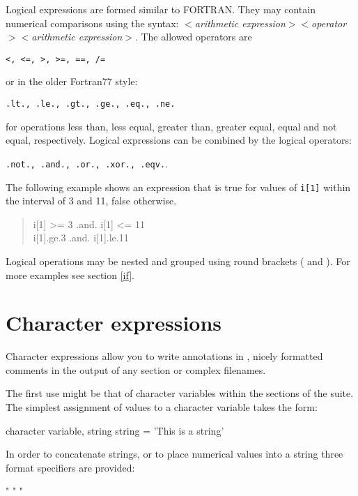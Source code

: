 Logical expressions are formed similar to FORTRAN. They may contain
numerical comparisons using the syntax: {\it $<$arithmetic
expression$><$operator$><$arithmetic expression$>$}. The allowed
operators are 

{\tt <, <=, >, >=, ==, /=}

or in the older Fortran77 style:

{\tt .lt., .le., .gt., .ge., .eq., .ne.} 

for operations less than, less equal, greater than,
greater equal, equal and not equal, respectively. Logical
expressions can be combined by the logical operators:

 {\tt .not., .and., .or., .xor., .eqv.}.

The following example shows an
expression that is true for values of {\tt i[1]} within the interval
of 3 and 11, false otherwise.

\begin{quote}
  i[1] >= 3 .and. i[1] <= 11 \\
  i[1].ge.3 .and. i[1].le.11
\end{quote}

Logical operations may be nested and grouped using round
brackets ( and ). For more examples see section \ref{if}.


\section{Character expressions\label{char-exp}}

Character expressions allow you to write annotations in \kuplot, nicely 
formatted comments in the output of any section or complex filenames.

The first use might be that of character variables within the sections 
of the \Discus suite. The simplest assignment of values to a character 
variable takes the form:
\begin{MacVerbatim}
  character variable, string
  string = 'This is a string'
\end{MacVerbatim}

In order to concatenate strings, or to place numerical values into a 
string three format specifiers are provided:

\begin{MacVerbatim}
  "%
  "%
  "%
\end{MacVerbatim}

